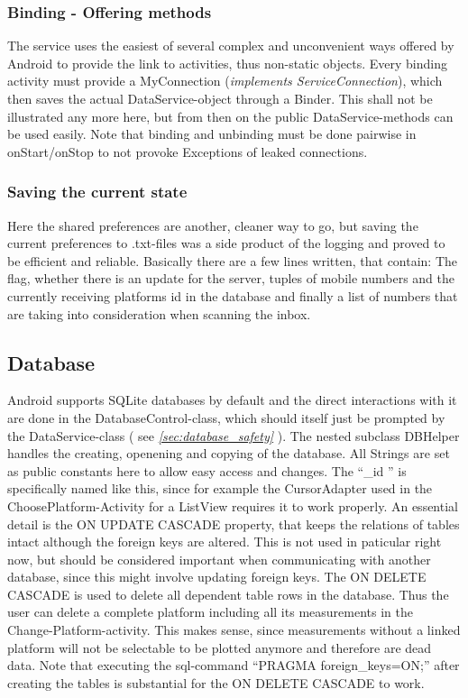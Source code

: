 \documentclass[11pt,oneside,a4paper]{scrartcl}
\begin{document}
\subsubsection{Binding - Offering methods}
The service uses the easiest of several complex and unconvenient ways offered by Android to provide the link to activities, thus non-static objects. Every binding activity must provide a MyConnection (\textit{implements ServiceConnection}), which then saves the actual DataService-object through a Binder. This shall not be illustrated any more here, but from then on the public DataService-methods can be used easily. Note that binding and unbinding must be done pairwise in onStart/onStop to not provoke Exceptions of leaked connections.

\subsubsection{Saving the current state}
Here the shared preferences are another, cleaner way to go, but saving the current preferences to .txt-files was a side product of the logging and proved to be efficient and reliable.
Basically there are a few lines written, that contain: The flag, whether there is an update for the server, tuples of mobile numbers and the currently receiving platforms id in the database and finally a list of numbers that are taking into consideration when scanning the inbox.


\subsection{Database}
Android supports SQLite databases by default and the direct interactions with it are done in the DatabaseControl-class, which should itself just be prompted by the DataService-class ( see \textit{\ref{sec:database_safety} } ). The nested subclass DBHelper handles the creating, openening and copying of the database. All Strings are set as public constants here to allow easy access and changes. The ``\_{}id '' is specifically named like this, since for example the CursorAdapter used in the ChoosePlatform-Activity for a ListView requires it to work properly. An essential detail is the ON UPDATE CASCADE property, that keeps the relations of tables intact although the foreign keys are altered. This is not used in paticular right now, but should be considered important when communicating with another database, since this might involve updating foreign keys. The ON DELETE CASCADE is used to delete all dependent table rows in the database. Thus the user can delete a complete platform including all its measurements in the Change-Platform-activity. This makes sense, since measurements without a linked platform will not be selectable to be plotted anymore and therefore are dead data. Note that executing the sql-command ``PRAGMA foreign\_{}keys=ON;'' after creating the tables is substantial for the ON DELETE CASCADE to work.
\end{document}
